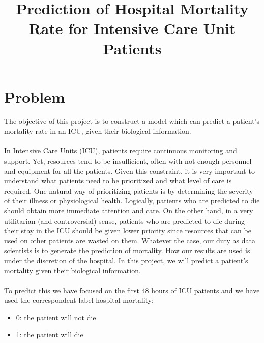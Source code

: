 \documentclass[12pt, letterpaper]{article}
\title{Prediction of Hospital Mortality Rate for Intensive Care Unit Patients}
\date{}
\begin{document}
\maketitle
\section{Problem}
The objective of this project is to construct a model which can predict a patient's mortality rate in an ICU, given their biological information. \\
\\
In Intensive Care Units (ICU), patients require continuous monitoring and support. Yet, resources tend to be insufficient, often with not enough personnel and equipment for all the patients. Given this constraint, it is very important to understand what patients need to be prioritized and what level of care is required. 
One natural way of prioritizing patients is by determining the severity of their illness or physiological health. Logically, patients who are predicted to die should obtain more immediate attention and care. On the other hand, in a very utilitarian (and controversial) sense, patients who are predicted to die during their stay in the ICU should be given lower priority since resources that can be used on other patients are wasted on them. Whatever the case, our duty as data scientists is to generate the prediction of mortality. How our results are used is under the discretion of the hospital. In this project, we will predict a patient’s mortality given their biological information.\\
\\
To predict this we have focused on the first 48 hours of ICU patients and we have used the correspondent label hospital mortality: \\

\begin{itemize}
  \item 0: the patient will not die
  \item  1: the patient will die
\end{itemize}
\end{document}
